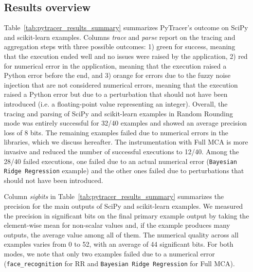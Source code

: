 \documentclass[11pt]{article}
\newcommand{\tristan}[1]{\color{orange}\textbf{From Tristan:} #1\color{black}\xspace}
\newcommand{\gkmod}[2]{\color{purple}\sout{#1} #2\color{black}\xspace}
\newcommand{\Yohan}[1]{\color{green!75!black}\textbf{Yohan:} #1\color{black}\xspace}
\newcommand{\pytracer}[0]{PyTracer\xspace}
\begin{document}
\subsection{Results overview}

Table~\ref{tab:pytracer_results_summary} summarizes
\pytracer's outcome on SciPy and scikit-learn examples.
Columns \textit{trace} and \textit{parse} report on the tracing and aggregation steps with three possible outcomes: 1) green for success, meaning that the execution ended well and no issues were raised by the application, 2) red for numerical error in the application, meaning that the execution raised a Python error before the end, and 3) orange for errors due to the fuzzy noise injection that are not considered numerical errors, meaning that the execution raised a Python error but due to a perturbation that should not have been introduced (i.e. a floating-point value representing an integer).
Overall, the tracing and parsing of SciPy and scikit-learn examples in Random Rounding mode was entirely successful for 32/40 examples and showed an average precision loss of 8 bits. The remaining examples failed due to numerical errors in the libraries, which we discuss hereafter. The instrumentation with Full MCA is more invasive and reduced the number of successful executions to 12/40. Among the 28/40 failed executions, one failed due to an actual numerical error (\texttt{Bayesian Ridge Regression} example) and the other ones failed due to 
perturbations that should not have been introduced.

Column \textit{sigbits} in Table~\ref{tab:pytracer_results_summary} summarizes the precision for the main outputs of SciPy and scikit-learn examples. 
We measured the precision in significant bits on the final primary example output by taking the element-wise mean for non-scalar values and, if the example produces many outputs, the average value among all of them. The numerical quality across all examples varies from 0 to 52, with an average of 44 significant bits. For both modes, we note that only two examples failed due to a numerical error 
(\texttt{face\_recognition} for RR and \texttt{Bayesian Ridge Regression} for Full MCA).
\end{document}
